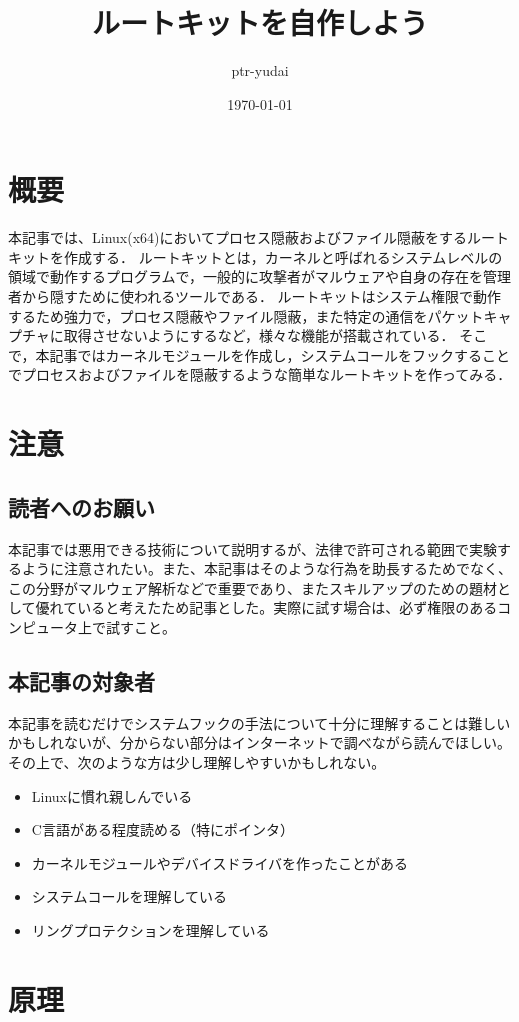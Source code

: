 \documentclass{jsarticle}
\title{ルートキットを自作しよう}
\author{ptr-yudai}
\date{\today}
\begin{document}
\section{概要}
本記事では、Linux(x64)においてプロセス隠蔽およびファイル隠蔽をするルートキットを作成する．
ルートキットとは，カーネルと呼ばれるシステムレベルの領域で動作するプログラムで，一般的に攻撃者がマルウェアや自身の存在を管理者から隠すために使われるツールである．
ルートキットはシステム権限で動作するため強力で，プロセス隠蔽やファイル隠蔽，また特定の通信をパケットキャプチャに取得させないようにするなど，様々な機能が搭載されている．
そこで，本記事ではカーネルモジュールを作成し，システムコールをフックすることでプロセスおよびファイルを隠蔽するような簡単なルートキットを作ってみる．

\section{注意}
  \subsection{読者へのお願い}
  本記事では悪用できる技術について説明するが、法律で許可される範囲で実験するように注意されたい。また、本記事はそのような行為を助長するためでなく、この分野がマルウェア解析などで重要であり、またスキルアップのための題材として優れていると考えたため記事とした。実際に試す場合は、必ず権限のあるコンピュータ上で試すこと。
  \subsection{本記事の対象者}
  本記事を読むだけでシステムフックの手法について十分に理解することは難しいかもしれないが、分からない部分はインターネットで調べながら読んでほしい。その上で、次のような方は少し理解しやすいかもしれない。
  \begin{itemize}
  \item Linuxに慣れ親しんでいる
  \item C言語がある程度読める（特にポインタ）
  \item カーネルモジュールやデバイスドライバを作ったことがある
  \item システムコールを理解している
  \item リングプロテクションを理解している
  \end{itemize}

\newpage

\section{原理}
\end{document}
